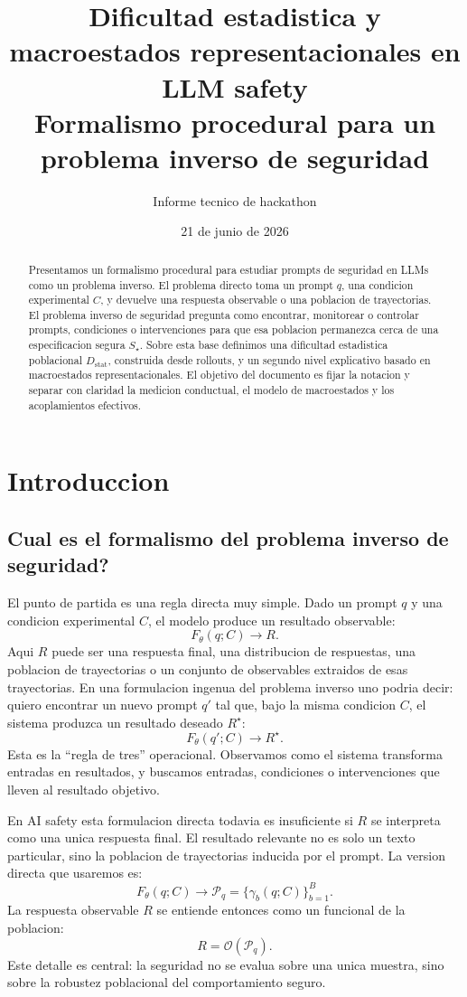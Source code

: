 ﻿\documentclass[10pt,twocolumn]{article}
\title{\vspace{-0.7cm}\textbf{\textcolor{titleblue}{Dificultad estadistica y macroestados representacionales en LLM safety}}\\
\large Formalismo procedural para un problema inverso de seguridad}
\author{Informe tecnico de hackathon}
\date{21 de junio de 2026}
\newcommand{\Dstat}{D_{\mathrm{stat}}}
\newcommand{\traj}{\gamma}
\newcommand{\rollouts}{\mathcal{P}}
\newcommand{\obs}{\mathcal{O}}
\begin{document}
\maketitle

\begin{abstract}
Presentamos un formalismo procedural para estudiar prompts de seguridad en LLMs como un problema inverso. El problema directo toma un prompt \(q\), una condicion experimental \(C\), y devuelve una respuesta observable o una poblacion de trayectorias. El problema inverso de seguridad pregunta como encontrar, monitorear o controlar prompts, condiciones o intervenciones para que esa poblacion permanezca cerca de una especificacion segura \(S_\star\). Sobre esta base definimos una dificultad estadistica poblacional \(\Dstat\), construida desde rollouts, y un segundo nivel explicativo basado en macroestados representacionales. El objetivo del documento es fijar la notacion y separar con claridad la medicion conductual, el modelo de macroestados y los acoplamientos efectivos.
\end{abstract}

\section{Introduccion}

\subsection{Cual es el formalismo del problema inverso de seguridad?}

El punto de partida es una regla directa muy simple. Dado un prompt \(q\) y una condicion experimental \(C\), el modelo produce un resultado observable:
\[
F_{\theta}(q;C)\longrightarrow R.
\]
Aqui \(R\) puede ser una respuesta final, una distribucion de respuestas, una poblacion de trayectorias o un conjunto de observables extraidos de esas trayectorias. En una formulacion ingenua del problema inverso uno podria decir: quiero encontrar un nuevo prompt \(q'\) tal que, bajo la misma condicion \(C\), el sistema produzca un resultado deseado \(R^\star\):
\[
F_{\theta}(q';C)\longrightarrow R^\star.
\]
Esta es la ``regla de tres'' operacional. Observamos como el sistema transforma entradas en resultados, y buscamos entradas, condiciones o intervenciones que lleven al resultado objetivo.

En AI safety esta formulacion directa todavia es insuficiente si \(R\) se interpreta como una unica respuesta final. El resultado relevante no es solo un texto particular, sino la poblacion de trayectorias inducida por el prompt. La version directa que usaremos es:
\[
F_{\theta}(q;C)
\longrightarrow
\rollouts_q
=
\{\traj_b(q;C)\}_{b=1}^{B}.
\]
La respuesta observable \(R\) se entiende entonces como un funcional de la poblacion:
\[
R=\obs(\rollouts_q).
\]
Este detalle es central: la seguridad no se evalua sobre una unica muestra, sino sobre la robustez poblacional del comportamiento seguro.
\end{document}
